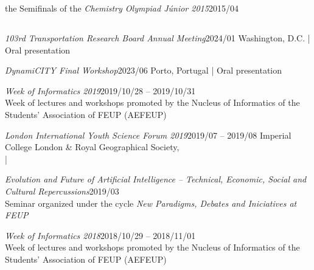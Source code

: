 \documentclass{cv}
\newif\ifen
\newif\ifpt
\newcommand{\en}[1]{\ifen#1\fi}
\newcommand{\pt}[1]{\ifpt#1\fi}
\begin{document}
\begin{jobopt}{\en{Participation in} the Semifinals of the \textit{Chemistry Olympiad Júnior 2015}}{2015/04}
{    \subsection*{\en{Forums, lectures, conferences \& congresses}}
    \begin{job}{\textit{103rd Transportation Research Board Annual Meeting}}{2024/01}%
        Washington, D.C. |
        Oral presentation
    \end{job}
    \begin{job}{\textit{DynamiCITY Final Workshop}}{2023/06}%
        Porto, Portugal |
        Oral presentation
    \end{job}
    \begin{jobopt}{\textit{Week of Informatics 2019}}{2019/10/28 -- 2019/10/31}
        \en{Faculty of Engineering of the University of Porto}\\
        Week of lectures and workshops promoted by the Nucleus of Informatics of the Students' Association of FEUP (AEFEUP)
    \end{jobopt}
    \begin{job}{\textit{London International Youth Science Forum 2019}}{2019/07 -- 2019/08}%
        Imperial College London \& Royal Geographical Society, \en{London}\\
        \en{Poster presentation} | \en{Supported by the Calouste Gulbenkian Foundation}
    \end{job}
    \begin{jobopt}{\textit{Evolution and Future of Artificial Intelligence -- Technical, Economic, Social and Cultural Repercussions}}{2019/03}%
        \en{Faculty of Engineering of the University of Porto}\\
        Seminar organized under the cycle \textit{New Paradigms, Debates and Iniciatives at FEUP}
    \end{jobopt}
    \begin{jobopt}{\textit{Week of Informatics 2018}}{2018/10/29 -- 2018/11/01}
        \en{Faculty of Engineering of the University of Porto}\\
        Week of lectures and workshops promoted by the Nucleus of Informatics of the Students' Association of FEUP (AEFEUP)

\end{jobopt}}
\end{jobopt}
\end{document}

